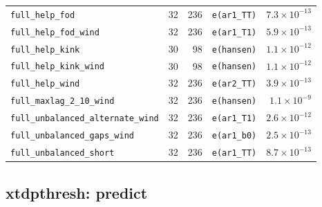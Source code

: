 \documentclass[10.5pt,a4paper]{article}
\begin{document}
\begin{longtable}{@{}p{3.6cm}rrp{4.9cm}r@{}}
\texttt{full\_\allowbreak{}help\_\allowbreak{}fod} & 32 & 236 & \texttt{e(ar1\_\allowbreak{}TT)} & $7.3\times10^{-13}$ \\
\texttt{full\_\allowbreak{}help\_\allowbreak{}fod\_\allowbreak{}wind} & 32 & 236 & \texttt{e(ar1\_\allowbreak{}T1)} & $5.9\times10^{-13}$ \\
\texttt{full\_\allowbreak{}help\_\allowbreak{}kink} & 30 & 98 & \texttt{e(hansen)} & $1.1\times10^{-12}$ \\
\texttt{full\_\allowbreak{}help\_\allowbreak{}kink\_\allowbreak{}wind} & 30 & 98 & \texttt{e(hansen)} & $1.1\times10^{-12}$ \\
\texttt{full\_\allowbreak{}help\_\allowbreak{}wind} & 32 & 236 & \texttt{e(ar2\_\allowbreak{}TT)} & $3.9\times10^{-13}$ \\
\texttt{full\_\allowbreak{}maxlag\_\allowbreak{}2\_\allowbreak{}10\_\allowbreak{}wind} & 32 & 236 & \texttt{e(hansen)} & $1.1\times10^{-9}$ \\
\texttt{full\_\allowbreak{}unbalanced\_\allowbreak{}alternate\_\allowbreak{}wind} & 32 & 236 & \texttt{e(ar1\_\allowbreak{}T1)} & $2.6\times10^{-12}$ \\
\texttt{full\_\allowbreak{}unbalanced\_\allowbreak{}gaps\_\allowbreak{}wind} & 32 & 236 & \texttt{e(ar1\_\allowbreak{}b0)} & $2.5\times10^{-13}$ \\
\texttt{full\_\allowbreak{}unbalanced\_\allowbreak{}short} & 32 & 236 & \texttt{e(ar1\_\allowbreak{}TT)} & $8.7\times10^{-13}$ \\
\bottomrule
\end{longtable}

\subsection*{xtdpthresh: predict}
\end{document}
